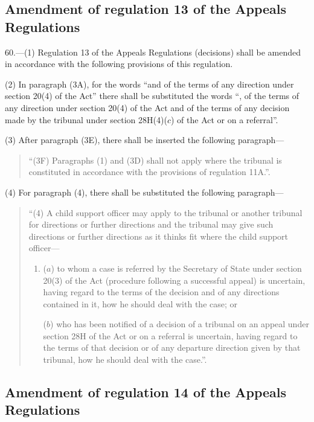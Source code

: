 \documentclass[12pt,a4paper]{article}
\begin{document}
\subsection[60. Amendment of regulation 13 of the Appeals Regulations]{Amendment of regulation 13 of the Appeals Regulations}

60.—(1) Regulation 13 of
the Appeals Regulations (decisions) shall be amended in accordance with the
following provisions of this regulation.

(2) In paragraph (3A), for the words “and of the terms of any direction under
section 20(4) of the Act” there shall be substituted the words “, of the terms
of any direction under section 20(4) of the Act and of the terms of any decision
made by the tribunal under section 28H(4)($c$) of the Act or on a referral”.

(3) After paragraph (3E), there shall be inserted the following paragraph—
\begin{quotation}
“(3F) Paragraphs (1) and (3D) shall not apply where the tribunal is constituted
in accordance with the provisions of regulation 11A.”.
\end{quotation}

(4) For paragraph (4), there shall be substituted the following paragraph—
\begin{quotation}
“(4) A child support officer may apply to the tribunal or another tribunal for
directions or further directions and the tribunal may give such directions or
further directions as it thinks fit where the child support officer—
\begin{enumerate}\item[]
($a$) to whom a case is referred by the Secretary of State under section 20(3) of
the Act (procedure following a successful appeal) is uncertain, having regard to
the terms of the decision and of any directions contained in it, how he should
deal with the case; or

($b$) who has been notified of a decision of a tribunal on an appeal under section
28H of the Act or on a referral is uncertain, having regard to the terms of that
decision or of any departure direction given by that tribunal, how he should
deal with the case.”.
\end{enumerate}
\end{quotation}

\subsection[61. Amendment of regulation 14 of the Appeals Regulations]{Amendment of regulation 14 of the Appeals Regulations}
\end{document}
